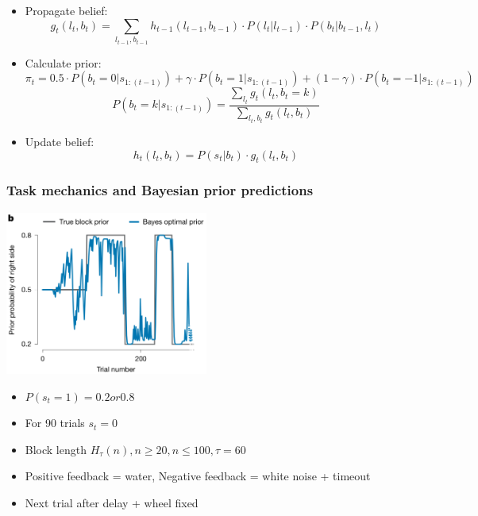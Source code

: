 \documentclass{beamer}
\begin{document}
\begin{frame}
\begin{center}
\begin{tikzpicture}
\end{tikzpicture}
  \begin{itemize}
      \tiny
    \item Propagate belief: \begin{equation}\label{eq:1}
        g_{t}(l_{t}, b_{t}) = \sum_{l_{t-1}, b_{t-1}} h_{t-1}(l_{t-1}, b_{t-1}) \cdot P(l_{t} | l_{t-1}) \cdot P(b_{t} | b_{t-1}, l_{t})
    \end{equation}
    \item Calculate prior: \begin{equation}\label{eq:2}
        \pi_{t} = 0.5 \cdot P(b_{t}=0|s_{1:(t-1)}) + \gamma \cdot P(b_{t}=1|s_{1:(t-1)}) + (1-\gamma) \cdot P(b_{t}=-1|s_{1:(t-1)})
    \end{equation}
      \begin{equation}\label{eq:3}
        P(b_{t}=k | s_{1:(t-1)}) = \frac{\sum_{l_{t}} g_{t}(l_{t}, b_{t}=k)}{\sum_{l_{t}, b_{t}} g_{t}(l_{t}, b_{t})}
    \end{equation}
  \item Update belief: \begin{equation}\label{eq:4}
      h_{t}(l_{t}, b_{t}) = P(s_{t}|b_{t}) \cdot g_{t}(l_{t}, b_{t})
  \end{equation}
  \end{itemize}
  \end{center}
\end{frame}

\begin{frame}
  \frametitle{Task mechanics and Bayesian prior predictions}
  \begin{center}
    \includegraphics[width=0.5\textwidth, keepaspectratio]{./figure1b}
  \end{center}
  \begin{itemize}
    \item $P(s_{t} = 1) = 0.2 or 0.8$
    \item For 90 trials $s_{t} = 0$
    \item Block length $H_{\tau}(n), n \geq 20, n \leq 100, \tau = 60$
    \item Positive feedback = water, Negative feedback = white noise + timeout
    \item Next trial after delay + wheel fixed
  \end{itemize}
\end{frame}
\end{document}
